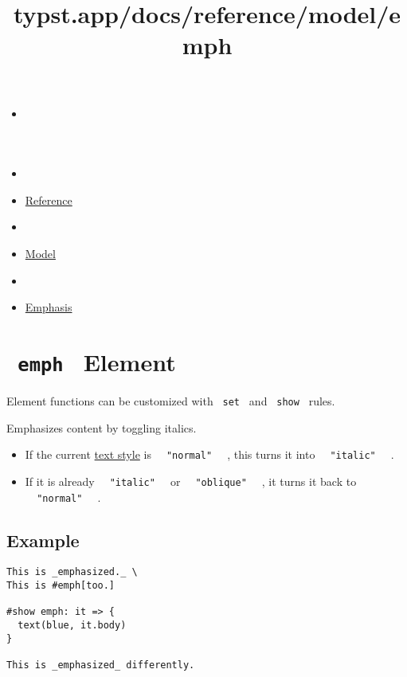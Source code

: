 \title{typst.app/docs/reference/model/emph}

\begin{itemize}
\tightlist
\item
  \href{/docs}{}
\item
  
\item
  \href{/docs/reference/}{Reference}
\item
  
\item
  \href{/docs/reference/model/}{Model}
\item
  
\item
  \href{/docs/reference/model/emph/}{Emphasis}
\end{itemize}

\section{\texorpdfstring{\texttt{\ emph\ } {{ Element
}}}{ emph   Element }}\label{summary}

\label{element-tooltip}
Element functions can be customized with \texttt{\ set\ } and
\texttt{\ show\ } rules.

Emphasizes content by toggling italics.

\begin{itemize}
\tightlist
\item
  If the current
  \href{/docs/reference/text/text/\#parameters-style}{text style} is
  \texttt{\ }{\texttt{\ "normal"\ }}\texttt{\ } , this turns it into
  \texttt{\ }{\texttt{\ "italic"\ }}\texttt{\ } .
\item
  If it is already \texttt{\ }{\texttt{\ "italic"\ }}\texttt{\ } or
  \texttt{\ }{\texttt{\ "oblique"\ }}\texttt{\ } , it turns it back to
  \texttt{\ }{\texttt{\ "normal"\ }}\texttt{\ } .
\end{itemize}

\subsection{Example}\label{example}

\begin{verbatim}
This is _emphasized._ \
This is #emph[too.]

#show emph: it => {
  text(blue, it.body)
}

This is _emphasized_ differently.
\end{verbatim}

